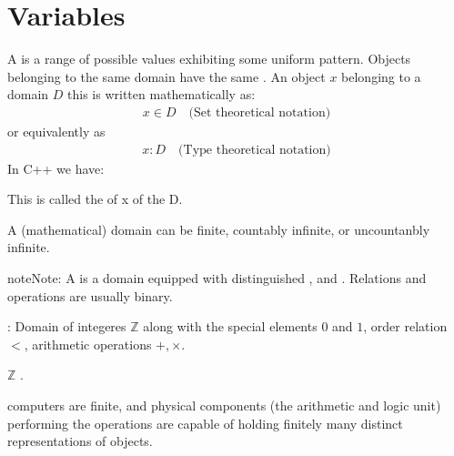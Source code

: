 \documentclass[a4paper,10pt,english]{jupyterBook}
\begin{document}
\chapter{Variables}
\label{\detokenize{text/progtut/variables:variables}}\label{\detokenize{text/progtut/variables::doc}}
\sphinxAtStartPar
A  is a range of possible values exhibiting some uniform pattern. Objects belonging to the same domain have the same . An object \(x\) belonging to a domain \(D\) this is written mathematically as:
\begin{equation*}
\begin{split}
x \in D \quad \text{(Set theoretical notation)}
\end{split}
\end{equation*}
\sphinxAtStartPar
or equivalently as
\begin{equation*}
\begin{split}
x : D \quad \text{(Type theoretical notation)}
\end{split}
\end{equation*}
\sphinxAtStartPar
In C++ we have:

\begin{sphinxVerbatim}[commandchars=\\\{\}]
 
\end{sphinxVerbatim}

\sphinxAtStartPar
This is called the  of  x of the  D.

\sphinxAtStartPar
A (mathematical) domain can be finite, countably infinite, or uncountanbly infinite.

\begin{sphinxadmonition}{note}{Note:}
\sphinxAtStartPar
A  is a domain equipped with distinguished ,  and . Relations and operations are usually binary.

\sphinxAtStartPar
{}: Domain of integeres \(\mathbb{Z}\) along with the special elements \(0\) and \(1\), order relation \(<\), arithmetic operations \(+, \times\).

\sphinxAtStartPar
\(\mathbb{Z}\) .
\end{sphinxadmonition}

\sphinxAtStartPar
computers are finite, and physical components (the arithmetic and logic unit) performing the operations are capable of holding finitely many distinct representations of objects.
\end{document}
